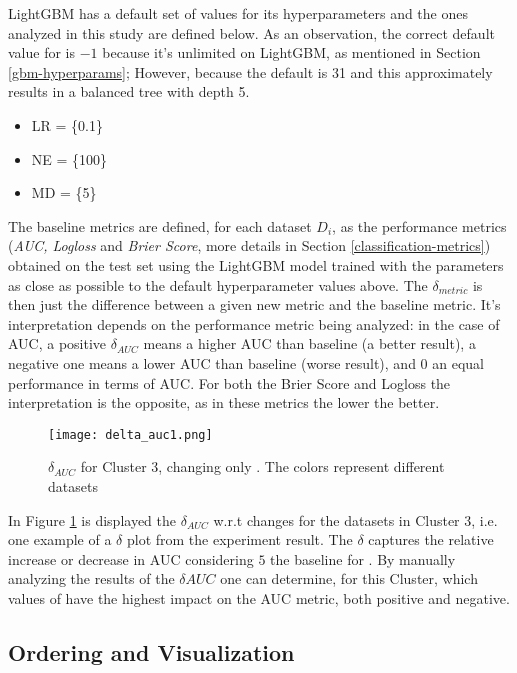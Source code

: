 LightGBM has a default set of values for its hyperparameters and the ones analyzed in this study  are defined below. As an observation, the correct default value for  is $-1$ because it's unlimited on LightGBM, as mentioned in Section \ref{gbm-hyperparams}; However, because the  default is 31 and this approximately results in a balanced tree with depth 5.

\begin{itemize}
    \item LR = \{0.1\}
    \item NE = \{100\}
    \item MD = \{5\}
\end{itemize}

The baseline metrics are defined, for each dataset $D_i$, as the performance metrics (\textit{AUC, Logloss} and \textit{Brier Score}, more details in Section \ref{classification-metrics}) obtained on the test set using the LightGBM model trained with the parameters as close as possible to the default hyperparameter values above. The $\delta_{metric}$ is then just the difference between a given new metric and the baseline metric. It's interpretation depends on the performance metric being analyzed: in the case of AUC, a positive $\delta_{AUC}$ means a higher AUC than baseline (a better result), a negative one means a lower AUC than baseline (worse result), and $0$ an equal performance in terms of AUC. For both the Brier Score and Logloss the interpretation is the opposite, as in these metrics the lower the better.

\begin{figure}[!h]
    \centering
    \texttt{[image: delta\_auc1.png]}
    \caption{$\delta_{AUC}$ for Cluster 3, changing only . The colors represent different datasets}
    \label{fig:delta-auc1}
\end{figure}

In Figure \ref{fig:delta-auc1} is displayed the $\delta_{AUC}$ w.r.t  changes for the datasets in Cluster 3, i.e. one example of a $\delta$ plot from the experiment result. The $\delta$ captures the relative increase or decrease in AUC considering $5$ the baseline for . By manually analyzing the results of the $\delta{AUC}$ one can determine, for this Cluster, which values of  have the highest impact on the AUC metric, both positive and negative.

\subsection{Ordering and Visualization}


